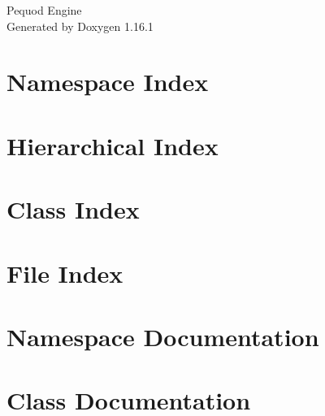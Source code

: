 \documentclass[twoside]{book}
\newcommand{\+}{\discretionary{\mbox{\scriptsize$\hookleftarrow$}}{}{}}
\newcommand{\clearemptydoublepage}{%
    \newpage{\pagestyle{empty}\cleardoublepage}%
  }
\begin{document}
  \raggedbottom
    \hypersetup{pageanchor=false,
                bookmarksnumbered=true,
                pdfencoding=unicode
               }
  \begin{titlepage}
  \vspace*{7cm}
  \begin{center}%
  {\Large Pequod Engine}\\
  \vspace*{1cm}
  {\large Generated by Doxygen 1.16.1}\\
  \end{center}
  \end{titlepage}
  \clearemptydoublepage
  \tableofcontents
  \clearemptydoublepage
  \hypersetup{pageanchor=true}


\chapter{Namespace Index}

\chapter{Hierarchical Index}

\chapter{Class Index}

\chapter{File Index}

\chapter{Namespace Documentation}

\chapter{Class Documentation}



























\end{document}
